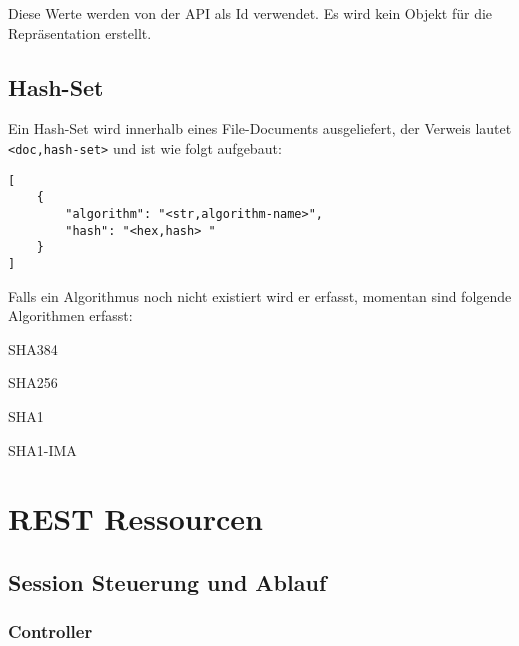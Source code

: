 \documentclass[10pt,a4paper]{scrartcl}
\begin{document}
Diese Werte werden von der API als Id verwendet. Es wird kein Objekt für die Repräsentation erstellt.

\subsection{Hash-Set}
Ein Hash-Set wird innerhalb eines File-Documents ausgeliefert, der Verweis lautet \texttt{<doc,hash-set>} und ist wie folgt aufgebaut:

\begin{lstlisting}
[
	{
		"algorithm": "<str,algorithm-name>",
		"hash": "<hex,hash>	"
	}
]
\end{lstlisting}

Falls ein Algorithmus noch nicht existiert wird er erfasst, momentan sind folgende Algorithmen erfasst:
\begin{itemize*}
	\item SHA384
	\item SHA256
	\item SHA1
	\item SHA1-IMA
\end{itemize*}


\pagebreak
\section{REST Ressourcen}

\subsection{Session Steuerung und Ablauf}

\subsubsection{Controller}
\end{document}
